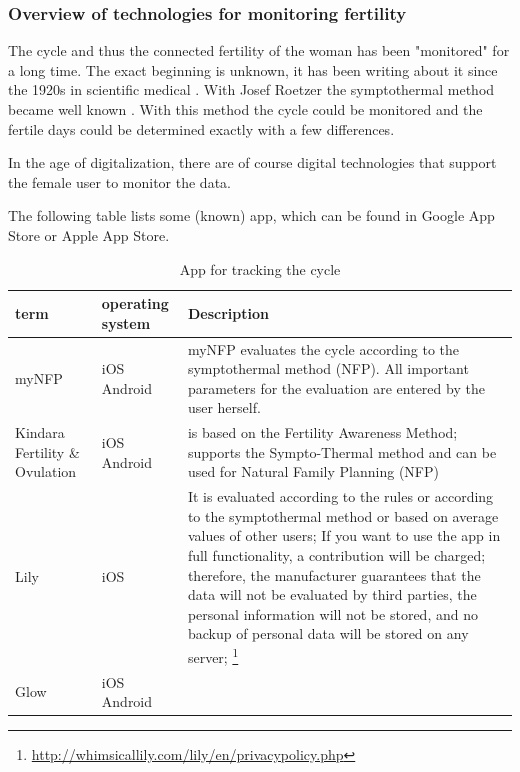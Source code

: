 \subsubsection{Overview of technologies for monitoring fertility}
The cycle and thus the connected fertility of the woman has been "monitored" for a long time. The exact beginning is unknown, it has been writing about it since the 1920s in scientific medical \cite{rotzer1988geschichte}. %
With Josef Roetzer the symptothermal method became well known \cite{roetzer1968erweiterte}. With this method the cycle could be monitored and the fertile days could be determined exactly with a few differences.

In the age of digitalization, there are of course digital technologies that support the female user to monitor the data.

The following table lists some (known) app, which can be found in Google App Store or Apple App Store.

\begin{table}[htb]
	\caption{App for tracking the cycle}
	\label{tab:typ_of_QR}
	\scriptsize
	\begin{center}
		\begin{tabular}{|p{1.5cm}|p{1cm}|p{4.5cm}|}
			\hline
			term & operating system  & Description \\
			\hline
			\hline
			myNFP &  iOS \newline Android &  myNFP evaluates the cycle according to the symptothermal method (NFP). All important parameters for the evaluation are entered by the user herself.
			\\
			\hline
			Kindara Fertility \& Ovulation  & iOS \newline Android & is based on the Fertility Awareness Method; supports the Sympto-Thermal method and can be used for Natural Family Planning (NFP) \\
			\hline
			Lily & iOS & It is evaluated according to the rules or according to the symptothermal method or based on average values of other users;
			If you want to use the app in full functionality, a contribution will be charged; therefore, the manufacturer guarantees that the data will not be evaluated by third parties, the personal information will not be stored, and no backup of personal data will be stored on any server; \footnote{\url{http://whimsicallily.com/lily/en/privacypolicy.php}} \\
			\hline
			Glow & iOS \newline Android & \\
			\hline
		\end{tabular}
	\end{center}
\end{table}


